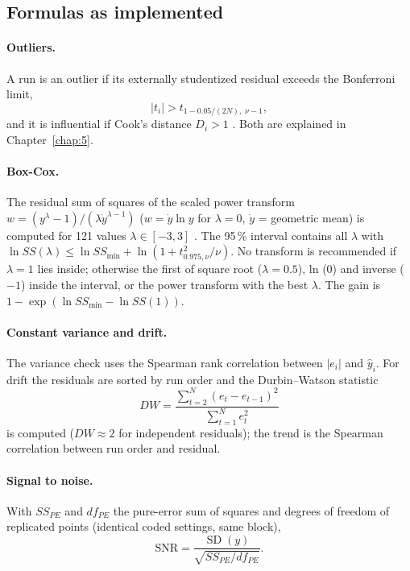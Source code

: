 \subsection{Formulas as implemented}
\paragraph{Outliers.} A run is an outlier if its externally studentized residual exceeds the Bonferroni limit,
\begin{equation}
|t_i| > t_{1 - 0.05/(2N),\; \nu - 1},
\label{eq:ch04-bonf}
\end{equation}
and it is influential if Cook's distance $D_i > 1$ \citep{cook1977}. Both are explained in Chapter~\ref{chap:5}.

\paragraph{Box-Cox.} The residual sum of squares of the scaled power transform
$w = (y^\lambda - 1)/(\lambda \dot y^{\lambda-1})$ ($w = \dot y \ln y$ for $\lambda = 0$, $\dot y$ = geometric mean)
is computed for 121 values $\lambda \in [-3, 3]$ \citep{boxcox1964}. The 95\,\% interval contains all $\lambda$ with
$\ln SS(\lambda) \le \ln SS_{\min} + \ln(1 + t^2_{0.975,\nu}/\nu)$. No transform is recommended if $\lambda = 1$
lies inside; otherwise the first of square root ($\lambda = 0.5$), ln (0) and inverse ($-1$) inside the interval, or
the power transform with the best $\lambda$. The gain is $1 - \exp(\ln SS_{\min} - \ln SS(1))$.

\paragraph{Constant variance and drift.} The variance check uses the Spearman rank correlation \citep{spearman1904}
between $|e_i|$ and $\hat y_i$. For drift the residuals are sorted by run order and the Durbin--Watson statistic
\citep{durbin1950}
\begin{equation}
DW = \frac{\sum_{t=2}^{N} (e_t - e_{t-1})^2}{\sum_{t=1}^{N} e_t^2}
\label{eq:ch04-dw}
\end{equation}
is computed ($DW \approx 2$ for independent residuals); the trend is the Spearman correlation between run order and
residual.

\paragraph{Signal to noise.} With $SS_{PE}$ and $df_{PE}$ the pure-error sum of squares and degrees of freedom of
replicated points (identical coded settings, same block),
\begin{equation}
\text{SNR} = \frac{\operatorname{SD}(y)}{\sqrt{SS_{PE}/df_{PE}}} .
\label{eq:ch04-snr}
\end{equation}

